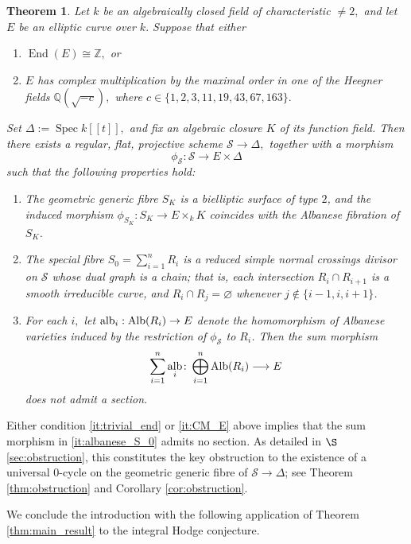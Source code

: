 \documentclass[11pt,letterpaper]{amsart}
\newcommand{\Alb}{\textnormal{Alb}}
\numberwithin{equation}{section}
\newtheorem{theorem}{Theorem}[section]
\theoremstyle{definition}
\theoremstyle{remark}
\newcommand{\Q}{\mathbb{Q}}
\newcommand{\Z}{\mathbb{Z}}
\DeclareMathOperator{\al}{alb}
\DeclareMathOperator{\End}{End}
\DeclareMathOperator{\Spec}{Spec}
\begin{document}
\begin{theorem}\label{thm:intro_degeneration_S} Let $k$ be an algebraically closed field of characteristic $\neq2,$ and let $E$ be an elliptic curve over $k.$ Suppose that either \begin{enumerate}[label=\textup{(\roman*)}]\item\label{it:trivial_end} $\End(E)\cong\Z,$ or \item\label{it:CM_E} $E$ has complex multiplication by the maximal order in one of the Heegner fields $\Q(\sqrt{-c}),$ where $c\in\{1,2,3,11,19,43,67,163\}.$\end{enumerate} Set $\Delta:=\Spec k[[t]],$ and fix an algebraic closure $K$ of its function field. Then there exists a regular, flat, projective scheme $\mathcal{S}\to\Delta,$ together with a morphism $$\phi_{\mathcal{S}}\colon\mathcal{S}\longrightarrow E\times\Delta$$ such that the following properties hold:
\begin{enumerate}
    \item\label{it:generic_fibre} The geometric generic fibre $S_{K}$ is a bielliptic surface of type $2$, and the induced morphism $\phi_{S_{K}}\colon S_{K}\to E\times_{k} K$ coincides with the Albanese fibration of $S_{K}$.
    \item\label{it:special_fibre} The special fibre $S_{0}=\sum_{i=1}^{n}R_{i}$ is a reduced simple normal crossings divisor on $\mathcal{S}$ whose dual graph is a chain; that is, each intersection $R_{i}\cap R_{i+1}$ is a smooth irreducible curve, and $R_{i}\cap R_{j}=\varnothing$ whenever $j\notin\{i-1,i,i+1\}$.
     \item\label{it:albanese_S_0} For each $i,$ let $\al_{i}:\Alb(R_{i})\to E$ denote the homomorphism of Albanese varieties induced by the restriction of $\phi_{\mathcal{S}}$ to $R_{i}$. Then the sum morphism $$\sum_{i=1}^{n}\al_{i}\colon\bigoplus_{i=1}^{n}\Alb(R_{i})\longrightarrow E$$ does not admit a section. 
\end{enumerate}  
\end{theorem}
Either condition \ref{it:trivial_end} or \ref{it:CM_E} above implies that the sum morphism in \eqref{it:albanese_S_0} admits no section. As detailed in $\S$\ref{sec:obstruction}, this constitutes the key obstruction to the existence of a universal $0$-cycle on the geometric generic fibre of $\mathcal{S}\to\Delta$; see Theorem \ref{thm:obstruction} and Corollary \ref{cor:obstruction}.\par
We conclude the introduction with the following application of Theorem \ref{thm:main_result} to the integral Hodge conjecture.
\end{document}
